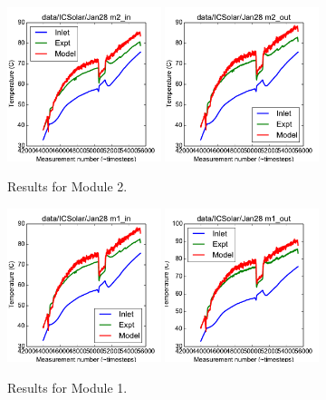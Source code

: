 \documentclass{article}
\begin{document}
\clearpage
\begin{figure}[!ht]
\centering
\includegraphics[width=0.4\textwidth]{../../data/ICSolar/images/Jan28_m2_in_unsteady.pdf}\hspace{0.05\textwidth}
\includegraphics[width=0.4\textwidth]{../../data/ICSolar/images/Jan28_m2_out_unsteady.pdf}\hspace{0.05\textwidth}\\
\caption{Results for Module 2.}\end{figure}
\begin{figure}[!ht]
\centering
\includegraphics[width=0.4\textwidth]{../../data/ICSolar/images/Jan28_m1_in_unsteady.pdf}\hspace{0.05\textwidth}
\includegraphics[width=0.4\textwidth]{../../data/ICSolar/images/Jan28_m1_out_unsteady.pdf}\hspace{0.05\textwidth}\\
\caption{Results for Module 1.}\end{figure}
\end{document}
